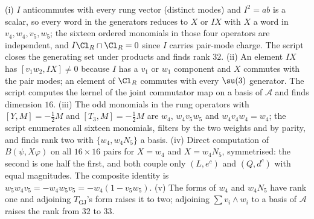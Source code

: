 (i) $I$ anticommutes with every rung vector (distinct modes) and $I^{2} = ab$ is a scalar, so every word in the generators reduces to $X$ or $IX$ with $X$ a word in $v_{4}, w_{4}, v_{5}, w_{5}$; the sixteen ordered monomials in those four operators are independent, and $I\Cl_{R} \cap \Cl_{R} = 0$ since $I$ carries pair-mode charge. The script closes the generating set under products and finds rank $32$. (ii) An element $IX$ has $[v_{1}w_{2}, IX] \ne 0$ because $I$ has a $v_{1}$ or $w_{1}$ component and $X$ commutes with the pair modes; an element of $\Cl_{R}$ commutes with every $\su(3)$ generator. The script computes the kernel of the joint commutator map on a basis of $\mathcal{A}$ and finds dimension $16$. (iii) The odd monomials in the rung operators with $[Y, M] = -\tfrac12 M$ and $[T_{3}, M] = -\tfrac12 M$ are $w_{4}$, $w_{4}v_{5}w_{5}$ and $w_{4}v_{4}w_{4} = w_{4}$; the script enumerates all sixteen monomials, filters by the two weights and by parity, and finds rank two with $\{w_{4}, w_{4}N_{5}\}$ a basis. (iv) Direct computation of $B(\psi, X\varphi)$ on all $16 \times 16$ pairs for $X = w_{4}$ and $X = w_{4}N_{5}$, symmetrised: the second is one half the first, and both couple only $(L, e^{c})$ and $(Q, d^{c})$ with equal magnitudes. The composite identity is $w_{5}w_{4}v_{5} = -w_{4}w_{5}v_{5} = -w_{4}(1 - v_{5}w_{5})$. (v) The forms of $w_{4}$ and $w_{4}N_{5}$ have rank one and adjoining $T_{\mathrm{GJ}}$'s form raises it to two; adjoining $\sum v_{i} \wedge w_{i}$ to a basis of $\mathcal{A}$ raises the rank from $32$ to $33$.
